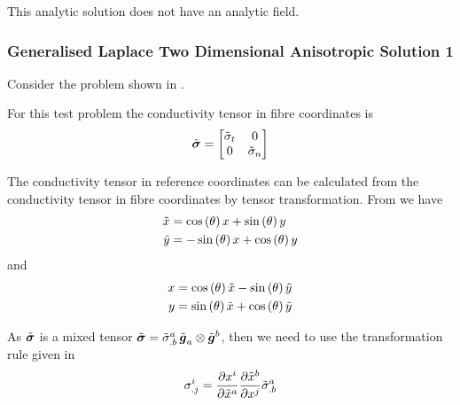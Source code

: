This analytic solution does not have an analytic field.

\subsubsection{Generalised Laplace Two Dimensional Anisotropic Solution 1}

Consider the problem shown in .


For this test problem the conductivity tensor in fibre coordinates is
\begin{equation}
  \tilde{ \boldsymbol{\mathit{ \sigma }} }=\begin{bmatrix}
    \tilde{ \sigma }_{t} & 0 \\ 
    0 & \tilde{ \sigma }_{n}
  \end{bmatrix}
\end{equation}

The conductivity tensor in reference coordinates can be calculated
from the conductivity tensor in fibre coordinates by tensor
transformation. From  we have
\begin{equation}
  \begin{aligned}
    \tilde{x}&=\cosine{\theta}x+\sine{\theta}y\\
    \tilde{y}&=-\sine{\theta}x+\cosine{\theta}y
  \end{aligned}
  \label{eqn:AnisoPlateFibreFromSpatialCoordinates}
\end{equation}
and
\begin{equation}
  \begin{aligned}
    x&=\cosine{\theta}\tilde{x}-\sine{\theta}\tilde{y}\\
    y&=\sine{\theta}\tilde{x}+\cosine{\theta}\tilde{y}
  \end{aligned}
  \label{eqn:AnisoPlateSpatialFromFibreCoordinates}
\end{equation}

As $\tilde{ \boldsymbol{\mathit{ \sigma }} }$ is a mixed tensor \ie
$\tilde{ \boldsymbol{\mathit{ \sigma }} }=\tilde{ \sigma }^{a}_{.b}\, \tilde{  \boldsymbol{ g }  }_{a} \otimes \tilde{  \boldsymbol{ g }  }^{b} $,
then we need to use the transformation rule given in
\ie
\begin{equation}
  \conductivitytensorsymbol^{i}_{.j}=\delby{x^{i}}{\tilde{x}^{a}}\delby{\tilde{x}^{b}}{x^{j}}\tilde{\conductivitytensorsymbol}^{a}_{.b}
  \label{eqn:AnsioPlateConductivityTensorTransformation}
\end{equation}

